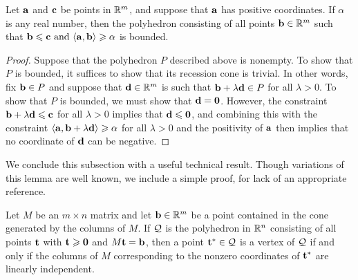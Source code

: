 \documentclass[11pt]{amsart}
\begin{document}

\begin{lemma}  
   \label{bounded polytope: L}
   Let $\mathbf{a}$ and $\mathbf{c}$ be points in $\mathbb{R}^m$, and suppose that $\mathbf{a}$ has positive coordinates.
   If $\alpha$ is any real number, then the polyhedron consisting of all points $\mathbf{b} \in \mathbb{R}^m$ such that  $\mathbf{b} \leqslant \mathbf{c} \text{ and } \langle \mathbf{a}, \mathbf{b} \rangle \geqslant \alpha$ is bounded.
\end{lemma}

\begin{proof}
   Suppose that the polyhedron $P$ described above is nonempty.
   To show that $P$ is bounded, it suffices to show that its recession cone is trivial.
   In other words, fix $\mathbf{b} \in P$ and suppose that $\mathbf{d} \in \mathbb{R}^m$ is such that $\mathbf{b} + \lambda \mathbf{d} \in P$ for all $\lambda > 0$.
   To show that $P$ is bounded, we must show that $\mathbf{d} = \mathbf{0}$.
   However,  the constraint $\mathbf{b} + \lambda \mathbf{d} \leqslant \mathbf{c}$ for all $\lambda>0$ implies that $\mathbf{d} \leqslant \mathbf{0}$, and combining this with the constraint $\langle \mathbf{a}, \mathbf{b} + \lambda \mathbf{d} \rangle \geqslant \alpha$ for all $\lambda > 0$ and the positivity of $\mathbf{a}$ then implies that no coordinate of $\mathbf{d}$ can be negative.
\end{proof}



We conclude this subsection with a useful technical result.  Though variations of this lemma are well known, we include a simple proof, for lack of an appropriate reference.


\begin{lemma}  
\label{vertex: L}
Let $M$ be an $m \times n$ matrix and let $\mathbf{b} \in \mathbb{R}^m$ be a point contained in the cone generated by the columns of $M$.  If $\mathcal{Q}$ is the polyhedron in $\mathbb{R}^n$  consisting of all points $\mathbf{t}$ with $\mathbf{t} \geqslant \mathbf{0}$ and $M \mathbf{t} = \mathbf{b}$, then a point $\mathbf{t}^{\ast} \in \mathcal{Q}$ is a vertex of $\mathcal{Q}$ if and only if the columns of $M$ corresponding to the nonzero coordinates of $\mathbf{t}^{\ast}$ are linearly independent.  %
\end{lemma}
\end{document}
